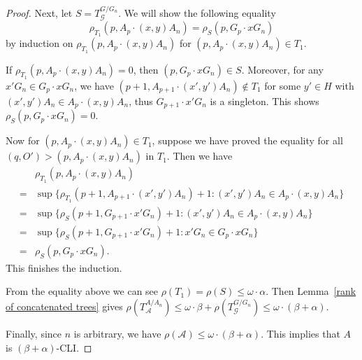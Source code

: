 \documentclass[11pt]{amsart}
\theoremstyle{definition}
\theoremstyle{remark}
\numberwithin{equation}{section}
\def\hier#1{$#1$-CLI}
\def\otr#1#2{T_{\mathcal{#1}}^{#2}}
\begin{document}
\begin{proof}


    Next, let $S=\otr{G}{G/G_n}$. We will show the following equality
    $$\rho_{T_1}(p,A_p\cdot(x,y)A_n)=\rho_S(p,G_p\cdot xG_n)$$
    by induction on $\rho_{T_1}(p,A_p\cdot(x,y)A_n)$ for $(p,A_p\cdot(x,y)A_n)\in T_1$.

    If $\rho_{T_1}(p,A_p\cdot(x,y)A_n)=0$, then $(p,G_p\cdot xG_n)\in S$. Moreover, for any $x'G_n\in G_p\cdot xG_n$, we have $(p+1,A_{p+1}\cdot(x',y')A_n)\notin T_1$ for some $y'\in H$ with $(x',y')A_n\in A_p\cdot(x,y)A_n$, thus $G_{p+1}\cdot x'G_n$ is a singleton. This shows $\rho_S(p,G_p\cdot xG_n)=0$.

    Now for $(p,A_p\cdot(x,y)A_n)\in T_1$, suppose we have proved the equality for all $(q,O')>(p,A_p\cdot(x,y)A_n)$ in $T_1$. Then we have
    \begin{align*}
        &\rho_{T_1}(p,A_p\cdot(x,y)A_n)\\
        =&\sup\{\rho_{T_1}(p+1,A_{p+1}\cdot(x',y')A_n)+1:(x',y')A_n\in A_p\cdot(x,y)A_n\}\\
        =&\sup\{\rho_S(p+1,G_{p+1}\cdot x'G_n)+1:(x',y')A_n\in A_p\cdot(x,y)A_n\}\\
        =&\sup\{\rho_S(p+1,G_{p+1}\cdot x'G_n)+1:x'G_n\in G_p\cdot xG_n\}\\
        =&\rho_S(p,G_p\cdot xG_n).
    \end{align*}
    This finishes the induction.

    From the equality above we can see $\rho(T_1)=\rho(S)\leq\omega\cdot\alpha$. Then Lemma~\ref{rank of concatenated trees} gives $\rho(\otr{A}{A/A_n})\leq\omega\cdot\beta+\rho(\otr{G}{G/G_n})\leq\omega\cdot(\beta+\alpha)$.

    Finally, since $n$ is arbitrary, we have $\rho(\mathcal{A})\leq\omega\cdot(\beta+\alpha)$. This implies that $A$ is $(\beta+\alpha)$-CLI.
\end{proof}
\end{document}

